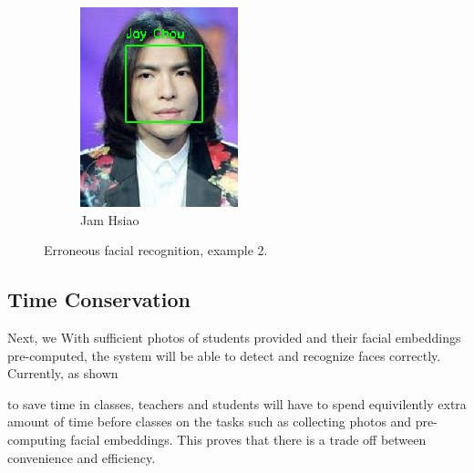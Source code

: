 \begin{figure}[!htb]
\begin{subfigure}[b]{0.3\linewidth}
    \includegraphics[width=\linewidth]{figures/false-recog-error2.png}
    \caption{Jam Hsiao}
  \end{subfigure}
  \caption{Erroneous facial recognition, example 2.}
  \label{fig:false-recog2}
\end{figure}
\vspace{0.5cm}


\subsection{Time Conservation}
Next, we
With sufficient photos of students provided and their facial embeddings pre-computed,
the system will be able to detect and recognize faces correctly. Currently, as shown

to save time in classes, teachers and students will have to spend equivilently extra amount of time
before classes on the tasks such as collecting photos and pre-computing facial embeddings.
This proves that there is a trade off between convenience and efficiency.
\vspace{0.2cm}

